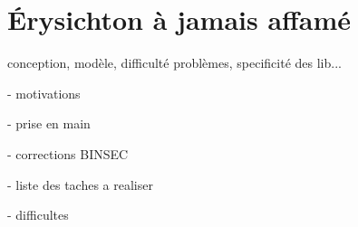 \chapter{Érysichton à jamais affamé}
\label{chap:erysichtonConception}


conception, modèle, difficulté problèmes, specificité des lib...

- motivations

- prise en main

- corrections BINSEC

- liste des taches a realiser

- difficultes



